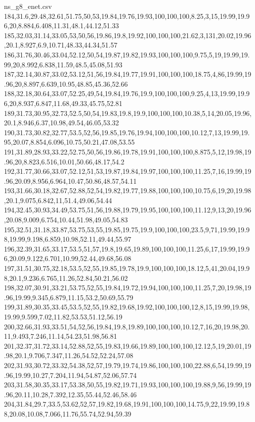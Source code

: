 \begin{filecontents*}[overwrite]{ns_g8_enet.csv}
184,31.6,29.48,32.61,51.75,50,53,19.84,19.76,19.93,100,100,100,8.25,3,15,19.99,19.96,20,8.884,6.408,11.31,48.1,44.12,51.33
185,32.03,31.14,33.05,53,50,56,19.86,19.8,19.92,100,100,100,21.62,3,131,20.02,19.96,20.1,8.927,6.9,10.71,48.33,44.34,51.57
186,31.76,30.46,33.04,52.12,50,54,19.87,19.82,19.93,100,100,100,9.75,5,19,19.99,19.99,20,8.992,6.838,11.59,48.5,45.08,51.93
187,32.14,30.87,33.02,53.12,51,56,19.84,19.77,19.91,100,100,100,18.75,4,86,19.99,19.96,20,8.897,6.639,10.95,48.85,45.36,52.66
188,32.18,30.64,33.07,52.25,49,54,19.84,19.76,19.9,100,100,100,9.25,4,13,19.99,19.96,20,8.937,6.847,11.68,49.33,45.75,52.81
189,31.73,30.95,32.73,52.5,50,54,19.83,19.8,19.9,100,100,100,10.38,5,14,20.05,19.96,20.1,8.946,6.37,10.98,49.54,46.05,53.32
190,31.73,30.82,32.77,53.5,52,56,19.85,19.76,19.94,100,100,100,10.12,7,13,19.99,19.95,20.07,8.854,6.096,10.75,50.21,47.08,53.55
191,31.89,28.93,33.22,52.75,50,56,19.86,19.78,19.91,100,100,100,8.875,5,12,19.98,19.96,20,8.823,6.516,10.01,50.66,48.17,54.2
192,31.77,30.66,33.07,52.12,51,53,19.87,19.84,19.97,100,100,100,11.25,7,16,19.99,19.96,20.09,8.956,6.964,10.47,50.86,48.57,54.11
193,31.66,30.18,32.67,52.88,52,54,19.82,19.77,19.88,100,100,100,10.75,6,19,20,19.98,20.1,9.075,6.842,11,51.4,49.06,54.44
194,32.45,30.93,34.49,53.75,51,56,19.88,19.79,19.95,100,100,100,11.12,9,13,20,19.96,20.08,9.009,6.754,10.44,51.98,49.05,54.83
195,32.51,31.18,33.87,53.75,53,55,19.85,19.75,19.9,100,100,100,23.5,9,71,19.99,19.98,19.99,9.198,6.859,10.98,52.11,49.44,55.97
196,32.39,31.65,33.17,53.5,51,57,19.8,19.65,19.89,100,100,100,11.25,6,17,19.99,19.96,20.09,9.122,6.701,10.99,52.44,49.68,56.08
197,31.51,30.75,32.18,53.5,52,55,19.85,19.78,19.9,100,100,100,18.12,5,41,20.04,19.98,20.1,9.236,6.765,11.26,52.84,50.21,56.02
198,32.07,30.91,33.21,53.75,52,55,19.84,19.72,19.94,100,100,100,11.25,7,20,19.98,19.96,19.99,9.345,6.879,11.15,53.2,50.69,55.79
199,31.89,30.35,33.45,53.5,52,55,19.82,19.68,19.92,100,100,100,12,8,15,19.99,19.98,19.99,9.599,7.02,11.82,53.53,51.12,56.19
200,32.66,31.93,33.51,54,52,56,19.84,19.8,19.89,100,100,100,10.12,7,16,20,19.98,20.11,9.493,7.246,11.14,54.23,51.98,56.81
201,32.37,31.72,33.14,52.88,52,55,19.83,19.66,19.89,100,100,100,12.12,5,19,20.01,19.98,20.1,9.706,7.347,11.26,54.52,52.24,57.08
202,31.93,30.72,33.32,54.38,52,57,19.79,19.74,19.86,100,100,100,22.88,6,54,19.99,19.96,19.99,10.27,7.204,11.94,54.87,52.06,57.74
203,31.58,30.35,33.17,53.38,50,55,19.82,19.71,19.93,100,100,100,19.88,9,56,19.99,19.96,20.11,10.28,7.392,12.35,55.44,52.46,58.46
204,31.84,29.7,33.5,53.62,52,57,19.82,19.68,19.91,100,100,100,14.75,9,22,19.99,19.88,20.08,10.08,7.066,11.76,55.74,52.94,59.39

\end{filecontents*}
